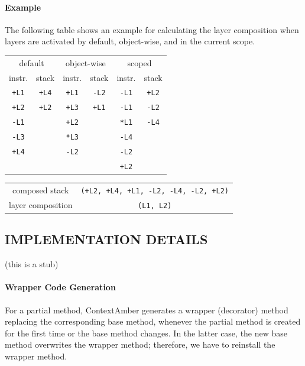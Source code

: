 \documentclass[english,paper=a4,twocolumn=true,DIV=calc,fontsize=9pt]{scrartcl}
\begin{document}
\paragraph{Example}
The following table shows an example for calculating the layer composition when layers are activated by default, object-wise, and in the current scope.
\begin{table}[h]
\centering
\begin{tabular}{cccccc}
\multicolumn{2}{c}{default} & \multicolumn{2}{c}{object-wise} & \multicolumn{2}{c}{scoped} \\
instr. & stack & instr. & stack & instr. & stack \\
\hline
\texttt{+L1} & \texttt{+L4} & \texttt{+L1} & \texttt{-L2} & \texttt{-L1} & \texttt{+L2} \\
\texttt{+L2} & \texttt{+L2} & \texttt{+L3} & \texttt{+L1} & \texttt{-L1} & \texttt{-L2} \\
\texttt{-L1} &              & \texttt{+L2} &              & \texttt{*L1} & \texttt{-L4} \\
\texttt{-L3} &              & \texttt{*L3} &              & \texttt{-L4} & \\
\texttt{+L4} &              & \texttt{-L2} &              & \texttt{-L2} & \\
             &              &              &              & \texttt{+L2} & \\
\end{tabular}
\begin{tabular}{cc}
composed stack & \texttt{(+L2, +L4, +L1, -L2, -L4, -L2, +L2)} \\
layer composition & \texttt{(L1, L2)} \\
\end{tabular}
\end{table}

\subsection{IMPLEMENTATION DETAILS}
(this is a stub)

\paragraph{Wrapper Code Generation}
For a partial method, ContextAmber generates a wrapper (decorator) method replacing the corresponding base method, whenever the partial method is created for the first time or the base method changes. In the latter case, the new base method overwrites the wrapper method; therefore, we have to reinstall the wrapper method.
\end{document}
